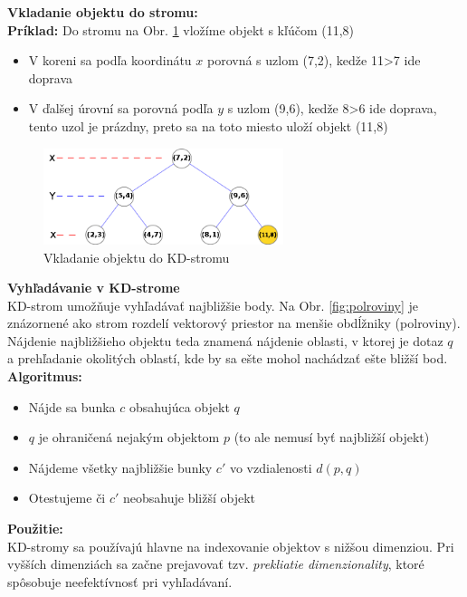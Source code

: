 \documentclass[12pt,a4paper,oneside]{fithesis2}
\begin{document}
\textbf{Vkladanie objektu do stromu:} \\
\textbf{Príklad:} Do stromu na Obr. \ref{fig:kdtree} vložíme objekt s kľúčom (11,8)
\begin{itemize}
\item V koreni sa podľa koordinátu $x$ porovná s uzlom (7,2), kedže 11>7 ide doprava
\item V ďalšej úrovní sa porovná podľa $y$ s uzlom (9,6), kedže 8>6 ide doprava, tento uzol je prázdny, preto sa na toto miesto uloží objekt (11,8)
\end{itemize}
\begin{figure}[h]
  		\centering
  		\includegraphics[width=7cm]{obr/kdtree01.png}
  		\caption{Vkladanie objektu do KD-stromu}
  		\label{fig:kdtree}
\end{figure}
\textbf{Vyhľadávanie v KD-strome} \\
KD-strom umožňuje vyhľadávať najbližšie body. Na Obr. \ref{fig:polroviny} je znázornené ako strom rozdelí vektorový priestor na menšie obdĺžniky (polroviny). Nájdenie najbližšieho objektu teda znamená nájdenie oblasti, v ktorej je dotaz $q$ a prehľadanie okolitých oblastí, kde by sa ešte mohol nachádzať ešte bližší bod.
\\
\textbf{Algoritmus:} 
\begin{itemize}
\item Nájde sa bunka $c$ obsahujúca objekt $q$
\item $q$ je ohraničená nejakým objektom $p$ (to ale nemusí byť najbližší objekt)
\item Nájdeme všetky najbližšie bunky $c'$ vo vzdialenosti $d(p,q)$
\item Otestujeme či $c'$ neobsahuje bližší objekt
\end{itemize}
\textbf{Použitie:}\\
KD-stromy sa používajú hlavne na indexovanie objektov s nižšou dimenziou. Pri vyšších dimenziách sa začne prejavovať tzv. \textit{prekliatie dimenzionality}, ktoré spôsobuje neefektívnosť pri vyhľadávaní.

  
\end{document}
